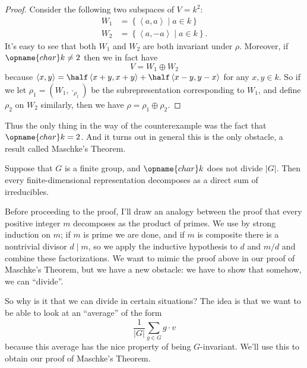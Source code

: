 \begin{proof}
	Consider the following two subspaces of $V = k^2$:
	\[
		\begin{aligned}
			W_1 &= \left\{ \left<a, a\right> \mid a \in k \right\} \\
			W_2 &= \left\{ \left<a, -a\right> \mid a \in k \right\}.
		\end{aligned}
	\]
	It's easy to see that both $W_1$ and $W_2$ are both invariant under $\rho$.
	Moreover, if $\opname{char} k \neq 2$ then we in fact have
	\[ V = W_1 \oplus W_2 \]
	because $\left<x,y\right> = \half \left<x+y, x+y\right> + \half \left<x-y, y-x\right>$ for any $x,y \in k$.
	So if we let $\rho_1 = (W_1, \cdot_{\rho_1})$ be the subrepresentation corresponding to $W_1$, and define $\rho_2$ on $W_2$ similarly,
	then we have $\rho = \rho_1 \oplus \rho_2$.
\end{proof}

Thus the only thing in the way of the counterexample was the fact that $\opname{char} k = 2$. And it turns out in general this is the only obstacle, a result called Maschke's Theorem.
\begin{theorem}
	Suppose that $G$ is a finite group, and $\opname{char} k$ does not divide $\left\lvert G \right\rvert$.
	Then every finite-dimensional representation decomposes as a direct sum of irreducibles.
\end{theorem}
Before proceeding to the proof, I'll draw an analogy between the proof that every positive integer $m$ decomposes as the product of primes. We use by strong induction on $m$; if $m$ is prime we are done, and if $m$ is composite there is a nontrivial divisor $d \mid m$, so we apply the inductive hypothesis to $d$ and $m/d$ and combine these factorizations. We want to mimic the proof above in our proof of Maschke's Theorem, but we have a new obstacle: we have to show that somehow, we can ``divide''.

So why is it that we can divide in certain situations?
The idea is that we want to be able to look at an ``average'' of the form
\[ \frac{1}{\left\lvert G \right\rvert} \sum_{g \in G} g \cdot v \]
because this average has the nice property of being $G$-invariant.
We'll use this to obtain our proof of Maschke's Theorem.

